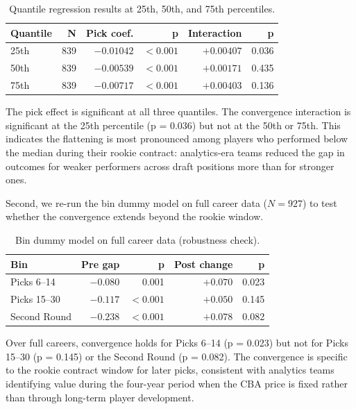 \documentclass[12pt,letterpaper]{article}
\begin{document}
\begin{table}[ht]
\centering
\small
\setlength{\tabcolsep}{5pt}
\begin{tabular}{@{}lrrrrr@{}}
\toprule
\textbf{Quantile} & \textbf{N} & \textbf{Pick coef.} & \textbf{p} & \textbf{Interaction} & \textbf{p} \\
\midrule
25th & 839 & $-0.01042$ & $<0.001$ & $+0.00407$ & 0.036 \\
50th & 839 & $-0.00539$ & $<0.001$ & $+0.00171$ & 0.435 \\
75th & 839 & $-0.00717$ & $<0.001$ & $+0.00403$ & 0.136 \\
\bottomrule
\end{tabular}
\caption{Quantile regression results at 25th, 50th, and 75th percentiles.}
\end{table}

The pick effect is significant at all three quantiles. The convergence interaction is significant at the 25th percentile (p = 0.036) but not at the 50th or 75th. This indicates the flattening is most pronounced among players who performed below the median during their rookie contract: analytics-era teams reduced the gap in outcomes for weaker performers across draft positions more than for stronger ones.

Second, we re-run the bin dummy model on full career data ($N = 927$) to test whether the convergence extends beyond the rookie window.

\begin{table}[ht]
\centering
\small
\setlength{\tabcolsep}{5pt}
\begin{tabular}{@{}lrrrr@{}}
\toprule
\textbf{Bin} & \textbf{Pre gap} & \textbf{p} & \textbf{Post change} & \textbf{p} \\
\midrule
Picks 6--14  & $-0.080$ & 0.001 & $+0.070$ & 0.023 \\
Picks 15--30 & $-0.117$ & $<0.001$ & $+0.050$ & 0.145 \\
Second Round & $-0.238$ & $<0.001$ & $+0.078$ & 0.082 \\
\bottomrule
\end{tabular}
\caption{Bin dummy model on full career data (robustness check).}
\end{table}

Over full careers, convergence holds for Picks 6--14 (p = 0.023) but not for Picks 15--30 (p = 0.145) or the Second Round (p = 0.082). The convergence is specific to the rookie contract window for later picks, consistent with analytics teams identifying value during the four-year period when the CBA price is fixed rather than through long-term player development.
\end{document}
